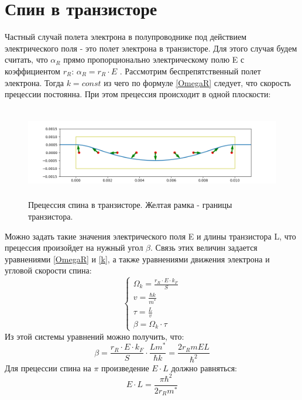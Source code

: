 \documentclass[12pt,oneside]{book}
\begin{document}
{{\section{Спин в транзисторе}
	Частный случай полета электрона в полупроводнике под действием электрического поля - это полет электрона в транзисторе.
	 Для этого случая будем считать, что  ${\alpha_R}$ прямо пропорционально электрическому полю E с коэффициентом ${r_R}$:
	${\alpha_R} = {r_R}\cdot{E}$ .
	\newline
	Рассмотрим беспрепятственный полет электрона. Тогда ${k = const}$ из чего по формуле \ref{OmegaR} следует, что скорость прецессии постоянна.
	При этом прецессия происходит в одной плоскости:
	\begin{figure}[h]
		\centering
		\includegraphics[width = 16cm, height = 4cm]{img/Transistor.png}
		\caption{Прецессия спина в транзисторе. Желтая рамка - границы транзистора.}
		\label{fig:f1}
	\end{figure}
	\newline
	Можно задать такие значения электрического поля E и длины транзистора L, что прецессия произойдет на нужный угол $\beta$. 
	Связь этих величин задается уравнениями \ref{OmegaR} и \ref{k}, а также уравнениями движения электрона и  угловой скорости спина:
	$$\begin{cases}
		{\Omega_k} = \frac{{{r_R}\cdot{E}}\cdot{k_F}}{S} \\
		{v} = \frac{{\hbar}k}{m^*} \\
		{\tau} = \frac{L}{v} \\
		{\beta} = {\Omega_{k}}\cdot{\tau}
	\end{cases}$$
	Из этой системы уравнений можно получить, что:
	\begin{equation}
		\label{beta}
		{\beta} = {\frac{{{r_R}\cdot{E}}\cdot{k_F}}{S}}\cdot{\frac{Lm^*}{{\hbar}k}} = \frac{2{r_R}{m}{E}{L}}{{\hbar}^2}
	\end{equation}
	\newline
	Для прецессии спина на ${\pi}$ произведение ${E}\cdot{L}$ должно равняться: 
	\begin{equation}
		\label{pi}
		{E}\cdot{L} = \frac{{\pi}{\hbar}^2}{2{r_R}{m^*}}

\end{equation}}}
\end{document}
